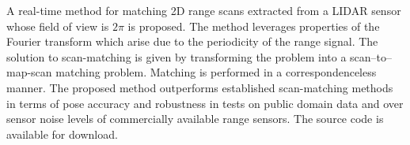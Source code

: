 A real-time method for matching 2D range scans extracted from a LIDAR sensor
whose field of view is $2\pi$ is proposed. The method leverages properties of
the Fourier transform which arise due to the periodicity of the range signal.
The solution to scan-matching is given by transforming the problem into a
scan--to--map-scan matching problem. Matching is performed in a
correspondenceless manner. The proposed method outperforms established
scan-matching methods in terms of pose accuracy and robustness in tests on
public domain data and over sensor noise levels of commercially available range
sensors. The source code is available for download.

